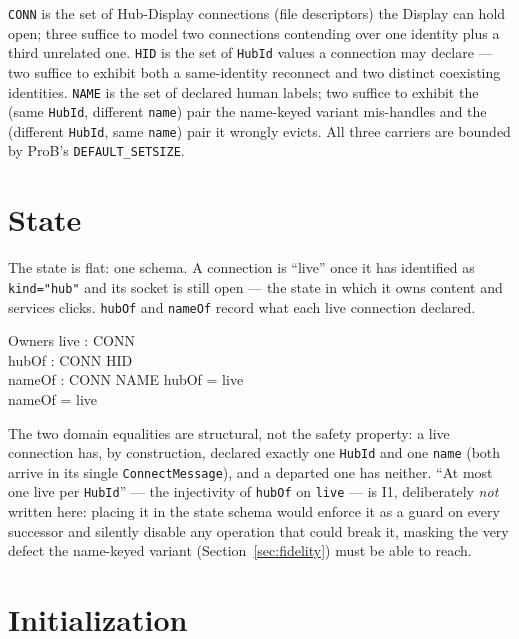 \documentclass[a4paper,10pt,fleqn]{article}
\begin{document}
\texttt{CONN} is the set of Hub-Display connections (file descriptors)
the Display can hold open; three suffice to model two connections
contending over one identity plus a third unrelated one.  \texttt{HID} is
the set of \texttt{HubId} values a connection may declare --- two suffice
to exhibit both a same-identity reconnect and two distinct coexisting
identities.  \texttt{NAME} is the set of declared human labels; two
suffice to exhibit the (same \texttt{HubId}, different \texttt{name}) pair
the name-keyed variant mis-handles and the (different \texttt{HubId},
same \texttt{name}) pair it wrongly evicts.  All three carriers are
bounded by ProB's \texttt{DEFAULT\_SETSIZE}.

\section{State}

The state is flat: one schema.  A connection is ``live'' once it has
identified as \texttt{kind="hub"} and its socket is still open --- the
state in which it owns content and services clicks.  \texttt{hubOf} and
\texttt{nameOf} record what each live connection declared.

\begin{schema}{Owners}
  live : \power CONN \\
  hubOf : CONN \pfun HID \\
  nameOf : CONN \pfun NAME
\where
  \dom hubOf = live \\
  \dom nameOf = live
\end{schema}

The two domain equalities are structural, not the safety property: a live
connection has, by construction, declared exactly one \texttt{HubId} and
one \texttt{name} (both arrive in its single \texttt{ConnectMessage}), and
a departed one has neither.  ``At most one live per \texttt{HubId}'' ---
the injectivity of \texttt{hubOf} on \texttt{live} --- is I1, deliberately
\emph{not} written here: placing it in the state schema would enforce it
as a guard on every successor and silently disable any operation that
could break it, masking the very defect the name-keyed variant
(Section~\ref{sec:fidelity}) must be able to reach.

\section{Initialization}
\end{document}

